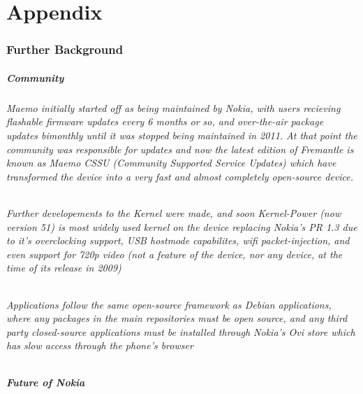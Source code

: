 \part{Appendix}
\section{Further Background}

\subsubsection{Community}\label{maemocomm}
\paragraph{Maemo initially started off as being maintained by Nokia, with users recieving flashable firmware updates every 6 months or so, and over-the-air package updates bimonthly until it was stopped being maintained in 2011. At that point the community was responsible for updates and now the latest edition of Fremantle is known as Maemo CSSU (Community Supported Service Updates) which have transformed the device into a very fast and almost completely open-source device.}
\paragraph{Further developements to the Kernel were made, and soon Kernel-Power (now version 51)  is most widely used kernel on the device replacing Nokia's PR 1.3 due to it's overclocking support, USB hostmode capabilites, wifi packet-injection, and even support for 720p video (not a feature of the device, nor any device, at the time of its release in 2009)}
\paragraph{Applications follow the same open-source framework as Debian applications, where any packages in the main repositories must be open source, and any third party closed-source applications must be installed through Nokia's Ovi store which has slow access through the phone's browser}

\subsubsection{Future of Nokia}
